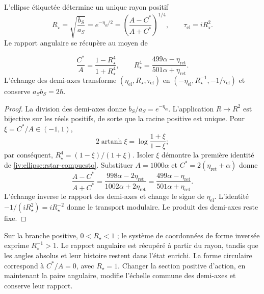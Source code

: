 \begin{proposition}
\label{iv:ellipse:radio-prop}
L’ellipse étiquetée détermine un unique rayon positif
\begin{equation}
 R_\star=\sqrt{\frac{b_S}{a_S}}
 =e^{-\eta_{\mathrm{el}}/2}
 =\left(\frac{A-C^*}{A+C^*}\right)^{1/4},
 \qquad \tau_{\mathrm{el}}=iR_\star^2.
 \label{iv:ellipse:rstar}
\end{equation}
Le rapport angulaire se récupère au moyen de

\begin{equation}
 \frac{C^*}{A}=\frac{1-R_\star^4}{1+R_\star^4},
 \qquad
 R_\star^4=
 \frac{499\alpha-\eta_{\mathrm{ret}}}
      {501\alpha+\eta_{\mathrm{ret}}}.
 \label{iv:ellipse:rstar-compuesto}
\end{equation}
L’échange des demi-axes transforme
\((\eta_{\mathrm{el}},R_\star,\tau_{\mathrm{el}})\) en
\((-\eta_{\mathrm{el}},R_\star^{-1},-1/\tau_{\mathrm{el}})\)
et conserve \(a_Sb_S=2\hbar\).

\end{proposition}
\begin{proof}
La division des demi-axes donne \(b_S/a_S=e^{-\eta_{\mathrm{el}}}\).
L’application \(R\mapsto R^2\) est bijective sur les réels
positifs, de sorte que la racine positive est unique.
Pour \(\xi=C^*/A\in(-1,1)\),
\[
 2\operatorname{artanh}\xi
 =\log\frac{1+\xi}{1-\xi};
\]
par conséquent, \(R_\star^4=(1-\xi)/(1+\xi)\).
Isoler \(\xi\) démontre la première identité de
\eqref{iv:ellipse:rstar-compuesto}. Substituer
\(A=1000\alpha\) et
\(C^*=2(\eta_{\mathrm{ret}}+\alpha)\) donne
\[
 \frac{A-C^*}{A+C^*}
 =\frac{998\alpha-2\eta_{\mathrm{ret}}}
        {1002\alpha+2\eta_{\mathrm{ret}}}
 =\frac{499\alpha-\eta_{\mathrm{ret}}}
        {501\alpha+\eta_{\mathrm{ret}}}.
\]
L’échange inverse le rapport des demi-axes et change le
signe de \(\eta_{\mathrm{el}}\). L’identité
\(-1/(iR_\star^2)=iR_\star^{-2}\) donne le transport
modulaire. Le produit des demi-axes reste fixe.

\end{proof}

Sur la branche positive, \(0<R_\star<1\) ; le système de coordonnées de forme
inversée exprime \(R_\star^{-1}>1\). Le rapport angulaire
est récupéré à partir du rayon, tandis que les angles absolus
et leur histoire restent dans l’état enrichi.
La forme circulaire correspond à \(C^*/A=0\), avec
\(R_\star=1\). Changer la section positive d’action,
en maintenant la paire angulaire, modifie l’échelle commune des
demi-axes et conserve leur rapport.

